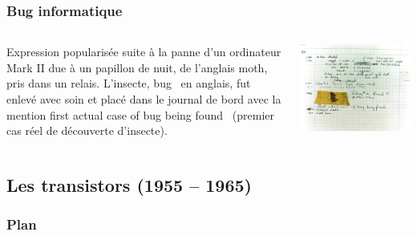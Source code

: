 \documentclass[utf8,10pt]{beamer}
\begin{document}
\begin{frame}
    \frametitle{Bug informatique}
    
    \begin{columns}
    \begin{column}{0.5\textwidth}
        Expression popularisée suite à la panne d'un ordinateur Mark II due à un papillon de nuit, de l'anglais moth, pris dans un relais. L’insecte, \og bug \fg\ en anglais, fut enlevé avec soin et placé dans le journal de bord avec la mention \og \alert{first actual case of bug being found} \fg\ (premier cas réel de découverte d'insecte). 
    \end{column}
    
    \begin{column}{0.5\textwidth}
        \includegraphics[scale=0.3]{./images/Bug}
    \end{column}
    \end{columns}
\end{frame}

\subsection{Les transistors (1955 -- 1965)}

\begin{frame}

	\frametitle{Plan}
	
	\tableofcontents[currentsubsection]
\end{frame}
\end{document}
